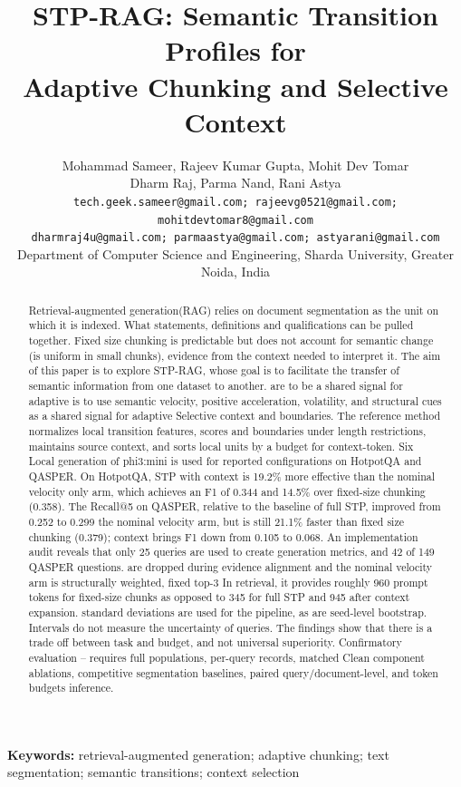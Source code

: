 \documentclass[10pt,a4paper]{article}
\title{\textbf{STP-RAG: Semantic Transition Profiles for\\Adaptive Chunking and Selective Context}}
\author{Mohammad Sameer, Rajeev Kumar Gupta, Mohit Dev Tomar\\[-1pt]
Dharm Raj, Parma Nand, Rani Astya\\
{\fontsize{6}{7.2}\selectfont\texttt{tech.geek.sameer@gmail.com; rajeevg0521@gmail.com; mohitdevtomar8@gmail.com}}\\[-1pt]
{\fontsize{6}{7.2}\selectfont\texttt{dharmraj4u@gmail.com; parmaastya@gmail.com; astyarani@gmail.com}}\\
\small Department of Computer Science and Engineering, Sharda University, Greater Noida, India}
\date{}
\begin{document}
\maketitle

\begin{abstract}
Retrieval-augmented generation(RAG) relies on document segmentation as the unit on which it is indexed. What statements, definitions and qualifications can be pulled together. Fixed size chunking is predictable but does not account for semantic change (is uniform in small chunks), evidence from the context needed
to interpret it. The aim of this paper is to explore STP-RAG, whose goal is to facilitate the transfer of semantic information from one dataset to another.
are to be a shared signal for adaptive is to use semantic velocity, positive acceleration, volatility, and structural cues as a shared signal for adaptive
Selective context and boundaries. The reference method normalizes local transition features, scores and boundaries under length restrictions, maintains source context, and sorts local units by a budget for context-token. Six
Local generation of phi3:mini is used for reported configurations on HotpotQA and QASPER. On HotpotQA, STP with context is 19.2\% more effective than the nominal velocity only arm, which achieves an F1 of 0.344 and 14.5\% over fixed-size chunking (0.358). The Recall@5 on QASPER, relative to the baseline of full STP, improved from 0.252 to 0.299 the nominal velocity arm, but is still 21.1\% faster than fixed size chunking (0.379); context brings F1 down from 0.105 to 0.068. An implementation audit reveals that only 25 queries are used to create generation metrics, and 42 of 149 QASPER questions.
are dropped during evidence alignment and the nominal velocity arm is structurally weighted, fixed top-3
In retrieval, it provides roughly 960 prompt tokens for fixed-size chunks as opposed to 345 for full STP and 945 after
context expansion. standard deviations are used for the pipeline, as are seed-level bootstrap.
Intervals do not measure the uncertainty of queries. The findings show that there is a trade off between task and budget, and
not universal superiority. Confirmatory evaluation – requires full populations, per-query records, matched
Clean component ablations, competitive segmentation baselines, paired query/document-level, and token budgets inference.
\end{abstract}

\noindent\textbf{Keywords:} retrieval-augmented generation; adaptive chunking; text segmentation; semantic transitions; context selection
\end{document}
